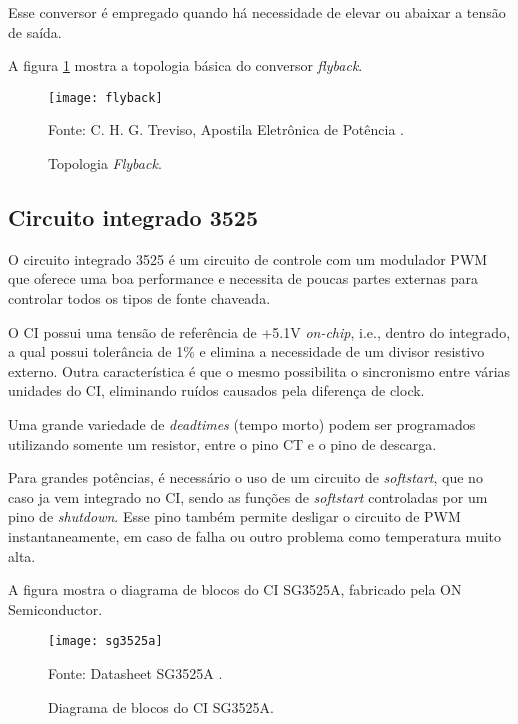 Esse conversor é empregado quando há necessidade de elevar ou abaixar a tensão de saída.

A figura \ref{fig:flyback} mostra a topologia básica do conversor \textit{flyback}.

\begin{figure}[H]
  \centering
  \caption{Topologia \textit{Flyback}.}
  \texttt{[image: flyback]}
  \label{fig:flyback}
  
  \small Fonte: C. H. G. Treviso, Apostila Eletrônica de Potência \cite{apostila}.
\end{figure}

\subsection{Circuito integrado 3525}
O circuito integrado 3525 é um circuito de controle com um modulador PWM que oferece uma boa performance e necessita de poucas partes externas para controlar todos os tipos de fonte chaveada. 

O CI possui uma tensão de referência de +5.1V \textit{on-chip}, i.e., dentro do integrado, a qual possui tolerância de 1\% e elimina a necessidade de um divisor resistivo externo. Outra característica é que o mesmo possibilita o sincronismo entre várias unidades do CI, eliminando ruídos causados pela diferença de clock.

Uma grande variedade de \textit{deadtimes} (tempo morto) podem ser programados utilizando somente um resistor, entre o pino CT e o pino de descarga. 

Para grandes potências, é necessário o uso de um circuito de \textit{softstart}, que no caso ja vem integrado no CI, sendo as funções de \textit{softstart} controladas por um pino de \textit{shutdown}. Esse pino também permite desligar o circuito de PWM instantaneamente, em caso de falha ou outro problema como temperatura muito alta.

A figura mostra o diagrama de blocos do CI SG3525A, fabricado pela ON Semiconductor.

\begin{figure}[H]
  \centering
  \caption{Diagrama de blocos do CI SG3525A.}
  \texttt{[image: sg3525a]}
  \label{fig:sg3525a}
  
  \small Fonte: Datasheet SG3525A \cite{sg3525a}.
\end{figure}
